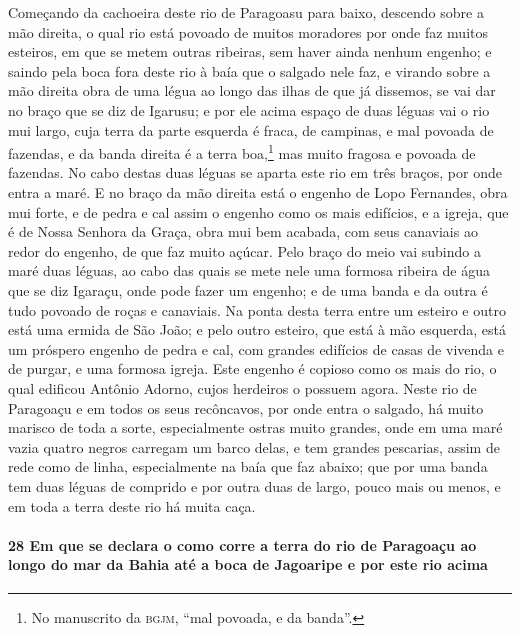 Começando da cachoeira deste rio de Paragoasu para baixo, descendo sobre a mão direita, o
qual rio está povoado de muitos moradores por onde faz muitos esteiros, em que se metem
outras ribeiras, sem haver ainda nenhum engenho; e saindo pela boca fora deste rio à baía
que o salgado nele faz, e virando sobre a mão direita obra de uma légua ao longo das ilhas
de que já dissemos, se vai dar no braço que se diz de Igarusu; e por ele acima espaço de
duas léguas vai o rio mui largo, cuja terra da parte esquerda é fraca, de campinas, e mal
povoada de fazendas, e da banda direita é a terra boa,\footnote{ No manuscrito da
\textsc{bgjm}, ``mal povoada, e da banda''.} mas muito fragosa e povoada de fazendas. No
cabo destas duas léguas se aparta este rio em três braços, por onde entra a maré. E no
braço da mão direita está o engenho de Lopo Fernandes, obra mui forte, e de pedra e cal
assim o engenho como os mais edifícios, e a igreja, que é de Nossa Senhora da Graça, obra
mui bem acabada, com seus canaviais ao redor do engenho, de que faz muito açúcar. Pelo
braço do meio vai subindo a maré duas léguas, ao cabo das quais se mete nele uma formosa
ribeira de água que se diz Igaraçu, onde pode fazer um engenho; e de uma banda e da outra
é tudo povoado de roças e canaviais. Na ponta desta terra entre um esteiro e outro está
uma ermida de São João; e pelo outro esteiro, que está à mão esquerda, está um próspero
engenho de pedra e cal, com grandes edifícios de casas de vivenda e de purgar, e uma
formosa igreja. Este engenho é copioso como os mais do rio, o qual edificou Antônio
Adorno, cujos herdeiros o possuem agora. Neste rio de Paragoaçu e em todos os seus
recôncavos, por onde entra o salgado, há muito marisco de toda a sorte, especialmente
ostras muito grandes, onde em uma maré vazia quatro negros carregam um barco delas, e tem
grandes pescarias, assim de rede como de linha, especialmente na baía que faz abaixo; que
por uma banda tem duas léguas de comprido e por outra duas de largo, pouco mais ou menos,
e em toda a terra deste rio há muita caça.

\paragraph{28 Em que se declara o como corre a terra do rio de Paragoaçu ao longo do mar
da Bahia até a boca de Jagoaripe e por este rio acima}

